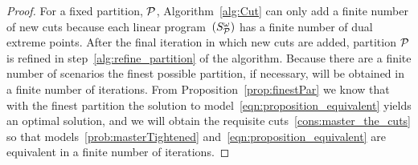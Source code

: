 \documentclass[11pt]{article}
\newcommand{\cQ}{{\cal Q}}
\newcommand{\cP}{{\cal P}}
\renewcommand{\underbar}{\underaccent{\bar}}
\begin{document}
\begin{proof}
	
	For a fixed partition, $\cP$, Algorithm~\ref{alg:Cut} can only add a finite number of new cuts because each linear program~\((S_{\cP}^\omega)\) has a finite number of dual extreme points. After the final iteration in which new cuts are added, partition $\cP$ is refined in step~\ref{alg:refine_partition} of the algorithm. Because there are a finite number of scenarios the finest possible partition, if necessary, will be obtained in a finite number of iterations. From Proposition~\ref{prop:finestPar} we know that with the finest partition the solution to model~\eqref{eqn:proposition_equivalent} yields an optimal solution, and we will obtain the requisite cuts~\eqref{cons:master_the_cuts} so that models~\eqref{prob:masterTightened} and~\eqref{eqn:proposition_equivalent} are equivalent in a finite number of iterations. 
	\end{proof}
	
\end{document}
